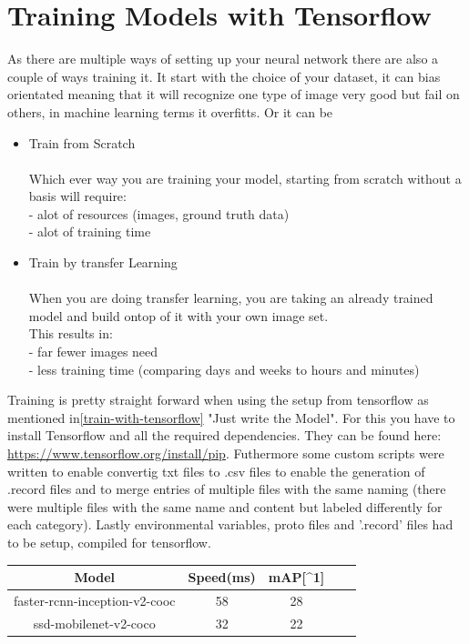 \section{Training Models with Tensorflow}\label{models-with-tensorflow}
As there are multiple ways of setting up your neural network there are also a couple of ways training it. It start with the choice of your
dataset, it can bias orientated meaning that it will recognize one type of image very good but fail on others, in machine learning terms it
overfitts. Or it can be 
\begin{itemize}
    \item Train from Scratch \\ \\
        Which ever way you are training your model, starting from scratch without a basis will require: \\
        {- alot of resources (images, ground truth data)} \\
        {- alot of training time} \\
    \item Train by transfer Learning \\ \\
        When you are doing transfer learning, you are taking an already trained model and build ontop of it with your own image set.\\
        This results in: \\
        {- far fewer images need} \\
        {- less training time (comparing days and weeks to hours and minutes)} \\
\end{itemize}
Training is pretty straight forward when using the setup from tensorflow as mentioned in\ref{train-with-tensorflow} "Just write the Model".
For this you have to install Tensorflow and all the required dependencies. They can be found here:
\url{https://www.tensorflow.org/install/pip}. Futhermore some custom scripts were written to enable convertig txt files to .csv files to
enable the generation of .record files and to merge entries of multiple files with the same naming (there were multiple files with the same
name and content but labeled differently for each category). Lastly environmental variables, proto
files and '.record' files had to be setup, compiled for tensorflow.
\begin{center}
    \begin{tabular}{|c|c|c|c|c|}
        \hline
        Model & Speed(ms) &  mAP[{\textasciicircum}1] \\ \hline
        faster-rcnn-inception-v2-cooc & 58 & 28 \\ \hline
        ssd-mobilenet-v2-coco & 32 & 22 \\ \hline
    \end{tabular}
\end{center}
